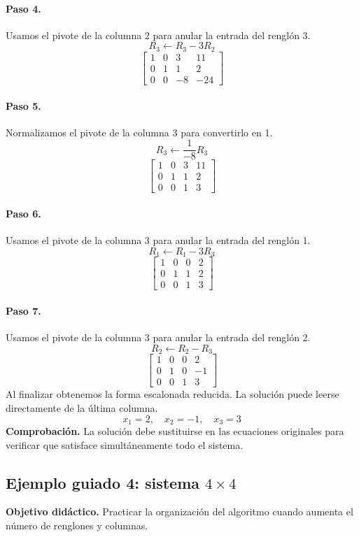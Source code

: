 \documentclass[12pt]{article}
\theoremstyle{remark}
\begin{document}
\paragraph{Paso 4.} Usamos el pivote de la columna 2 para anular la entrada del renglón 3.
\[
R_{3}\leftarrow R_{3}-3R_{2}
\]
\[
\left[\begin{array}{ccc|c}
1 & 0 & 3 & 11\\
0 & 1 & 1 & 2\\
0 & 0 & -8 & -24
\end{array}\right]
\]
\paragraph{Paso 5.} Normalizamos el pivote de la columna 3 para convertirlo en 1.
\[
R_{3}\leftarrow \frac{1}{-8}R_{3}
\]
\[
\left[\begin{array}{ccc|c}
1 & 0 & 3 & 11\\
0 & 1 & 1 & 2\\
0 & 0 & 1 & 3
\end{array}\right]
\]
\paragraph{Paso 6.} Usamos el pivote de la columna 3 para anular la entrada del renglón 1.
\[
R_{1}\leftarrow R_{1}-3R_{3}
\]
\[
\left[\begin{array}{ccc|c}
1 & 0 & 0 & 2\\
0 & 1 & 1 & 2\\
0 & 0 & 1 & 3
\end{array}\right]
\]
\paragraph{Paso 7.} Usamos el pivote de la columna 3 para anular la entrada del renglón 2.
\[
R_{2}\leftarrow R_{2}-R_{3}
\]
\[
\left[\begin{array}{ccc|c}
1 & 0 & 0 & 2\\
0 & 1 & 0 & -1\\
0 & 0 & 1 & 3
\end{array}\right]
\]
Al finalizar obtenemos la forma escalonada reducida. La solución puede leerse directamente de la última columna.
\[
\boxed{x_{1}=2,\quad x_{2}=-1,\quad x_{3}=3}
\]
\textbf{Comprobación.} La solución debe sustituirse en las ecuaciones originales para verificar que satisface simultáneamente todo el sistema.

\subsection*{Ejemplo guiado 4: sistema $4\times4$}
\textbf{Objetivo didáctico.} Practicar la organización del algoritmo cuando aumenta el número de renglones y columnas.
\end{document}
